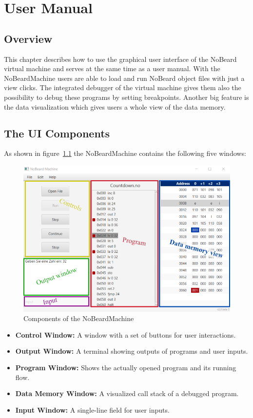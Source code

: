 \chapter{User Manual}
\lstset{language=NoBeardAsm}
\section{Overview}
This chapter describes how to use the graphical user interface of the NoBeard virtual machine and serves at the same time as a user manual.
With the NoBeardMachine users are able to load and run NoBeard object files with just a view clicks. The integrated debugger of the virtual machine gives them also the possibility to debug these programs by setting breakpoints. Another big feature is the data visualization which gives users a whole view of the data memory.
\section{The UI Components}
As shown in figure~\ref{fig:components} the NoBeardMachine contains the following five windows:

\begin{figure}[h] 
	\centering
	\includegraphics[scale=.87]{images/screenshot-0.png}
	\caption{Components of the NoBeardMachine}
	\label{fig:components}
\end{figure}

\begin{itemize}
\item \textbf{Control Window: }A window with a set of buttons for user interactions.
\item \textbf{Output Window: }A terminal showing outputs of programs and user inputs.
\item \textbf{Program Window: }Shows the actually opened program and its running flow.
\item \textbf{Data Memory Window: }A visualized call stack of a debugged program.
\item \textbf{Input Window: }A single-line field for user inputs.
\end{itemize}

